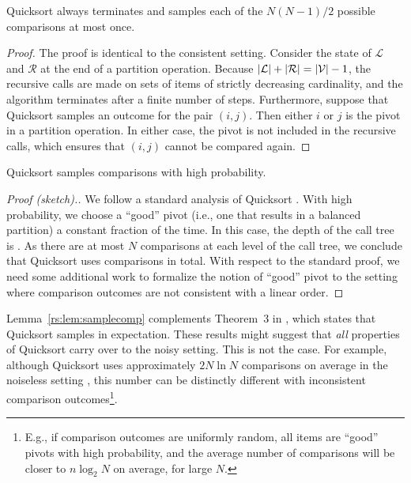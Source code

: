 \begin{lemma}
\label{rs:lem:termination}
Quicksort always terminates and samples each of the $N(N\!-\!1) / 2$ possible comparisons at most once.
\end{lemma}

\begin{proof}
The proof is identical to the consistent setting.
Consider the state of $\mathcal{L}$ and $\mathcal{R}$ at the end of a partition operation.
Because $\lvert\mathcal{L}\rvert + \lvert\mathcal{R}\rvert = \lvert\mathcal{V}\rvert - 1$, the recursive calls are made on sets of items of strictly decreasing cardinality, and the algorithm terminates after a finite number of steps.
Furthermore, suppose that Quicksort samples an outcome for the pair $(i, j)$.
Then either $i$ or $j$ is the pivot in a partition operation.
In either case, the pivot is not included in the recursive calls, which ensures that $(i, j)$ cannot be compared again.
\end{proof}

\begin{lemma}
\label{rs:lem:samplecomp}
Quicksort samples  comparisons with high probability.
\end{lemma}

\begin{proof}[Proof (sketch).]
We follow a standard analysis of Quicksort \citep[see, e.g.,][Section 3.3.3]{dubhashi2009concentration}.
With high probability, we choose a ``good'' pivot (i.e., one that results in a balanced partition) a constant fraction of the time.
In this case, the depth of the call tree is .
As there are at most $N$ comparisons at each level of the call tree, we conclude that Quicksort uses  comparisons in total.
With respect to the standard proof, we need some additional work to formalize the notion of ``good'' pivot to the setting where comparison outcomes are not consistent with a linear order.
\end{proof}

Lemma~\ref{rs:lem:samplecomp} complements Theorem~$3$ in \citet{ailon2010preference}, which states that Quicksort samples  in expectation.
These results might suggest that \emph{all} properties of Quicksort carry over to the noisy setting.
This is not the case.
For example, although Quicksort uses approximately $2N \ln N$ comparisons on average in the noiseless setting \citep{sedgewick2011algorithms}, this number can be distinctly different with inconsistent comparison outcomes\footnote{E.g., if comparison outcomes are uniformly random, all items are ``good'' pivots with high probability, and the average number of comparisons will be closer to $n \log_2 N$ on average, for large $N$.}.

